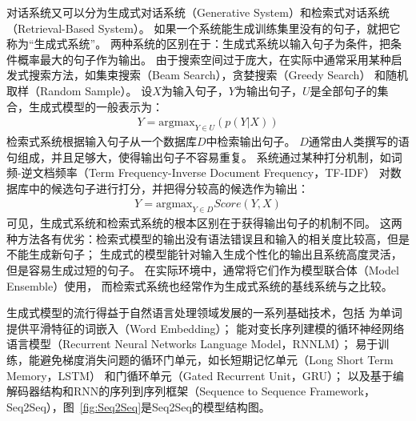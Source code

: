 对话系统又可以分为生成式对话系统（Generative System）和检索式对话系统（Retrieval-Based System）。
如果一个系统能生成训练集里没有的句子，就把它称为“生成式系统”。
两种系统的区别在于：生成式系统以输入句子为条件，把条件概率最大的句子作为输出。
由于搜索空间过于庞大，在实际中通常采用某种启发式搜索方法，如集束搜索（Beam Search），贪婪搜索（Greedy Search）
和随机取样（Random Sample）。
设$X$为输入句子，$Y$为输出句子，$U$是全部句子的集合，生成式模型的一般表示为：
\begin{align}
    Y = \text{argmax}_{Y\in U} \left(p(Y|X)\right)
\end{align}
检索式系统根据输入句子从一个数据库$D$中检索输出句子。
$D$通常由人类撰写的语句组成，并且足够大，使得输出句子不容易重复。
系统通过某种打分机制，如词频-逆文档频率（Term Frequency-Inverse Document Frequency，TF-IDF）
对数据库中的候选句子进行打分，并把得分较高的候选作为输出：
\begin{align}
    Y = \text{argmax}_{Y\in D} Score(Y, X)
\end{align}
可见，生成式系统和检索式系统的根本区别在于获得输出句子的机制不同。
这两种方法各有优劣：检索式模型的输出没有语法错误且和输入的相关度比较高，但是不能生成新句子；
生成式的模型能针对输入生成个性化的输出且系统高度灵活，但是容易生成过短的句子。
在实际环境中，通常将它们作为模型联合体（Model Ensemble）使用，
而检索式系统也经常作为生成式系统的基线系统与之比较。

生成式模型的流行得益于自然语言处理领域发展的一系列基础技术，包括
为单词提供平滑特征的词嵌入（Word Embedding）；
能对变长序列建模的循环神经网络语言模型（Recurrent Neural Networks Language Model，RNNLM）；
易于训练，能避免梯度消失问题的循环门单元，如长短期记忆单元（Long Short Term Memory，LSTM）
和门循环单元（Gated Recurrent Unit，GRU）；
以及基于编解码器结构和RNN的序列到序列框架（Sequence to Sequence Framework，Seq2Seq），图~\ref{fig:Seq2Seq}是Seq2Seq的模型结构图。

